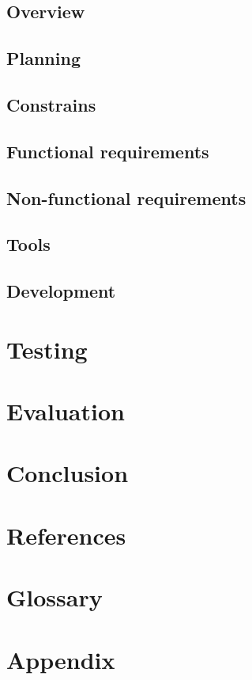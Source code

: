 \documentclass{article}
\begin{document}
  \subsection{Overview}
  \subsection{Planning}
  \subsection{Constrains}
  \subsection{Functional requirements}
  \subsection{Non-functional requirements}
  \subsection{Tools}
  \subsection{Development}

  \newpage
  \section{Testing}

  \newpage
  \section{Evaluation}

  \newpage
  \section{Conclusion}

  \newpage
  \section{References}
	

  \section{Glossary}
  \newpage
  \section{Appendix}
\end{document}
